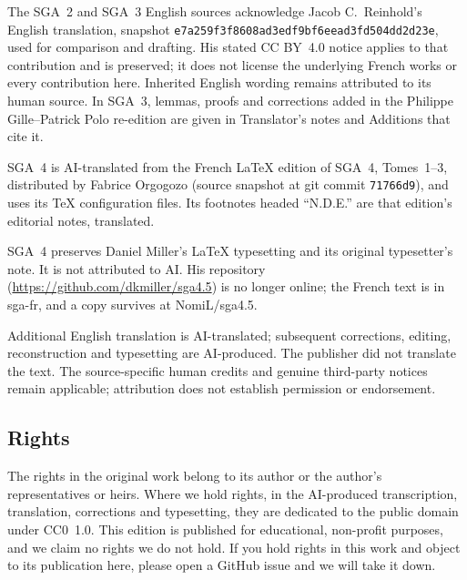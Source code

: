 The SGA~2 and SGA~3 English sources acknowledge Jacob C.~Reinhold's English
translation, snapshot \texttt{e7a259f3f8608ad3edf9bf6eead3fd504dd2d23e}, used
for comparison and drafting. His stated CC BY~4.0 notice applies to that
contribution and is preserved; it does not license the underlying French
works or every contribution here. Inherited English wording remains
attributed to its human source. In SGA~3, lemmas, proofs and corrections added
in the Philippe Gille--Patrick Polo re-edition are given in Translator's
notes and Additions that cite it.

SGA~4 is AI-translated from the French LaTeX edition of SGA~4, Tomes~1--3,
distributed by Fabrice Orgogozo (source snapshot at git commit
\texttt{71766d9}), and uses its TeX configuration files. Its footnotes headed
``N.D.E.'' are that edition's editorial notes, translated.

SGA~4\textonehalf{} preserves Daniel Miller's LaTeX typesetting and its
original typesetter's note. It is not attributed to AI. His repository
(\url{https://github.com/dkmiller/sga4.5}) is no longer online; the French
text is in sga-fr, and a copy survives at NomiL/sga4.5.

Additional English translation is AI-translated; subsequent corrections,
editing, reconstruction and typesetting are AI-produced. The publisher did
not translate the text. The source-specific human credits and genuine
third-party notices remain applicable; attribution does not establish
permission or endorsement.

\subsection*{Rights}
The rights in the original work belong to its author or the author's
representatives or heirs. Where we hold rights, in the AI-produced
transcription, translation, corrections and typesetting, they are dedicated
to the public domain under CC0~1.0. This edition is published for educational,
non-profit purposes, and we claim no rights we do not hold. If you hold
rights in this work and object to its publication here, please open a GitHub
issue and we will take it down.
